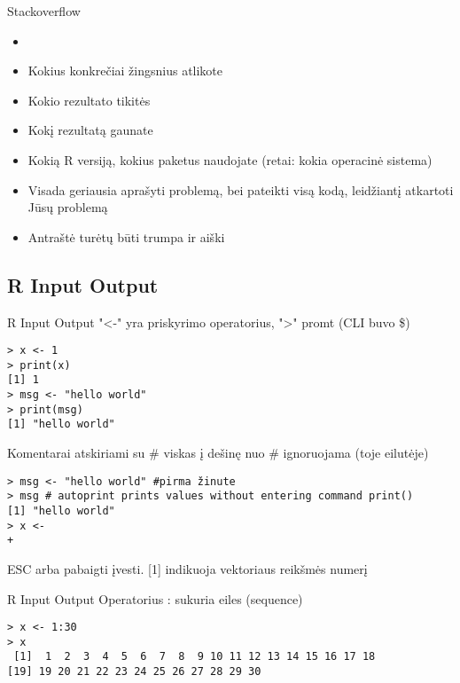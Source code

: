 \documentclass[11pt,xcolor=table]{beamer}
\begin{document}
\begin{frame}{Stackoverflow}
\begin{itemize}
\item \href{https://stackoverflow.com/}{\color{blue}{https://stackoverflow.com/}}
\item Kokius konkrečiai žingsnius atlikote
\item Kokio rezultato tikitės
\item Kokį rezultatą gaunate
\item Kokią R versiją, kokius paketus naudojate (retai: kokia operacinė sistema)
\item Visada geriausia aprašyti problemą, bei pateikti visą kodą, leidžiantį atkartoti Jūsų problemą
\item Antraštė turėtų būti trumpa ir aiški
\end{itemize}
\end{frame}

\subsection{R Input Output}


\begin{frame}[fragile]{R Input Output}
"<-" yra priskyrimo operatorius, ">" promt (CLI buvo \$)
\begin{lstlisting}
> x <- 1
> print(x)
[1] 1
> msg <- "hello world"
> print(msg)
[1] "hello world"
\end{lstlisting}

Komentarai atskiriami su \# viskas į dešinę nuo \# ignoruojama (toje eilutėje)
\begin{lstlisting}
> msg <- "hello world" #pirma žinute
> msg # autoprint prints values without entering command print()
[1] "hello world"
> x <- 
+ 
\end{lstlisting}
ESC arba pabaigti įvesti. [1] indikuoja vektoriaus reikšmės numerį
\end{frame}


\begin{frame}[fragile]{R Input Output}
Operatorius : sukuria eiles (sequence)
\begin{lstlisting}
> x <- 1:30
> x
 [1]  1  2  3  4  5  6  7  8  9 10 11 12 13 14 15 16 17 18
[19] 19 20 21 22 23 24 25 26 27 28 29 30
\end{lstlisting}
\end{frame}
\end{document}
